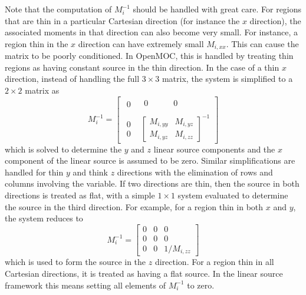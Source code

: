 Note that the computation of $M_i^{-1}$ should be handled with great care. For regions that are thin in a particular Cartesian direction (for instance the $x$ direction), the associated moments in that direction can also become very small. For instance, a region thin in the $x$ direction can have extremely small $M_{i,xx}$. This can cause the matrix to be poorly conditioned. In OpenMOC, this is handled by treating thin regions as having constant source in the thin direction. In the case of a thin $x$ direction, instead of handling the full $3 \times 3$ matrix, the system is simplified to a $2 \times 2$ matrix as
\begin{equation*}
	M_i^{-1} = 
	\begin{bmatrix}
		\begin{matrix}
			0  
		\end{matrix}
			& \begin{matrix} 
			 0\phantom{M_{i,yy}}  & 0\phantom{M_{i,yz}}
			 \end{matrix} \\
	    \begin{matrix} 
	    	0 \\ 0 
		\end{matrix}
		      & \begin{bmatrix}
				M_{i,yy}  & M_{i,yz} \\
				M_{i,yz}  & M_{i,zz}
			\end{bmatrix}^{-1}
	\end{bmatrix}
\end{equation*}
which is solved to determine the $y$ and $z$ linear source components and the $x$ component of the linear source is assumed to be zero. Similar simplifications are handled for thin $y$ and think $z$ directions with the elimination of rows and columns involving the variable. If two directions are thin, then the source in both directions is treated as flat, with a simple $1\times1$ system evaluated to determine the source in the third direction. For example, for a region thin in both $x$ and $y$, the system reduces to
\begin{equation*}
	M_i^{-1} = 
	\begin{bmatrix}
		0 & 0  & 0 \\
		0 & 0  & 0 \\
		0 & 0  & 1 / M_{i,zz}
	\end{bmatrix}
\end{equation*}
which is used to form the source in the $z$ direction. For a region thin in all Cartesian directions, it is treated as having a flat source. In the linear source framework this means setting all elements of $M_i^{-1}$ to zero.

